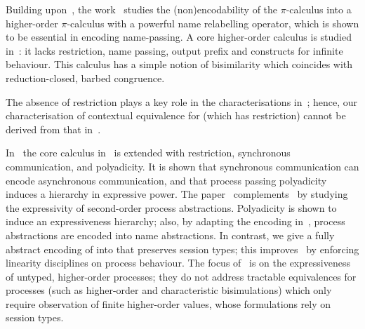 Building upon~\cite{ThomsenB:plachoasgcfhop},
the work~\cite{XuActa2012} studies 
the (non)encodability of the $\pi$-calculus into 
a higher-order $\pi$-calculus with a powerful 
name relabelling operator, which is 
shown to be essential in encoding name-passing. %
A core higher-order calculus is studied in~\cite{DBLP:journals/iandc/LanesePSS11}: 
it lacks restriction,  name passing, output prefix %
and constructs for infinite behaviour. 
This calculus  has 
a simple notion of bisimilarity which coincides with reduction-closed, barbed congruence.
{
The absence of restriction plays a key role in the characterisations in~\cite{DBLP:journals/iandc/LanesePSS11};
hence, our characterisation of contextual equivalence for \HO (which has restriction)
cannot be derived from that in~\cite{DBLP:journals/iandc/LanesePSS11}. 


In~\cite{DBLP:conf/icalp/LanesePSS10}
the core calculus in~\cite{DBLP:journals/iandc/LanesePSS11} is extended with restriction,
synchronous communication, and polyadicity. It is shown that 
synchronous communication can encode asynchronous communication, %
and that process passing polyadicity induces a hierarchy in expressive power. %
The paper~\cite{DBLP:conf/wsfm/XuYL13} 
complements~\cite{DBLP:conf/icalp/LanesePSS10} 
by studying the expressivity %
of 
second-order process abstractions.
Polyadicity is shown to induce an expressiveness hierarchy; 
also,
by adapting the encoding in~\cite{SangiorgiD:expmpa},
process abstractions are encoded into name abstractions.
In contrast, we 
give a fully abstract encoding of
 \PHOpp into \HO that preserves session types; this improves~\cite{DBLP:conf/icalp/LanesePSS10,DBLP:conf/wsfm/XuYL13}   
by enforcing linearity disciplines on process behaviour.
The focus of~\cite{DBLP:conf/icalp/LanesePSS10,DBLP:conf/wsfm/XuYL13} is on 
the expressiveness of untyped, higher-order processes; they
do not address 
tractable equivalences for processes  (such as 
higher-order and characteristic bisimulations) which only require observation of finite %
higher-order values,  
whose formulations rely on session types.}
